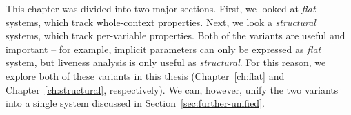 This chapter was divided into two major sections. First, we looked at \emph{flat} systems, which
track whole-context properties. Next, we look a \emph{structural} systems, which track per-variable
properties. Both of the variants are useful and important -- for example, implicit parameters can
only be expressed as \emph{flat} system, but liveness analysis is only useful as \emph{structural}.
For this reason, we explore both of these variants in this thesis (Chapter~\ref{ch:flat} and
Chapter~\ref{ch:structural}, respectively). We can, however, unify the two variants into a single
system discussed in Section~\ref{sec:further-unified}.
